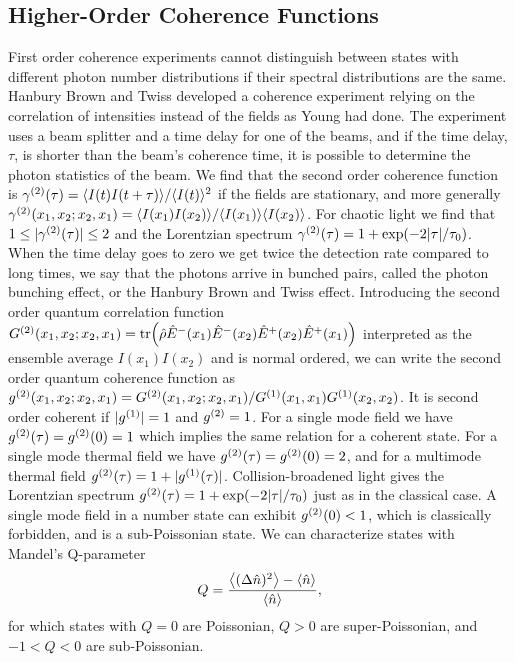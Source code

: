 \subsection{Higher-Order Coherence Functions}
First order coherence experiments cannot distinguish between states with different photon number distributions if their spectral distributions are the same. Hanbury Brown and Twiss developed a coherence experiment relying on the correlation of intensities instead of the fields as Young had done. The experiment uses a beam splitter and a time delay for one of the beams, and if the time delay, $\tau$, is shorter than the beam's coherence time, it is possible to determine the photon statistics of the beam. We find that the second order coherence function is $\gamma^{(2)}(\tau) = \langle I(t)I(t+\tau)\rangle / \langle I(t) \rangle^2$ if the fields are stationary, and more generally $\gamma^{(2)}(x_1,x_2;x_2,x_1) = \langle I(x_1)I(x_2)\rangle / \langle I(x_1) \rangle\langle I(x_2)\rangle$. For chaotic light we find that $1 \leq |\gamma^{(2)}(\tau)| \leq 2$ and the Lorentzian spectrum $\gamma^{(2)}(\tau) = 1 + \exp(-2|\tau|/\tau_0)$. When the time delay goes to zero we get twice the detection rate compared to long times, we say that the photons arrive in bunched pairs, called the photon bunching effect, or the Hanbury Brown and Twiss effect. Introducing the second order quantum correlation function $G^{(2)}(x_1,x_2;x_2,x_1) = \tr(\hat{\rho} \hat{E}^-(x_1) \hat{E}^-(x_2) \hat{E}^+(x_2) \hat{E}^+(x_1))$ interpreted as the ensemble average $I(x_1)I(x_2)$ and is normal ordered, we can write the second order quantum coherence function as $g^{(2)}(x_1,x_2;x_2,x_1) = G^{(2)}(x_1,x_2;x_2,x_1) / G^{(1)}(x_1,x_1)G^{(1)}(x_2,x_2)$. It is second order coherent if $|g^{(1)}| = 1$ and $g^{(2)}=1$. For a single mode field we have $g^{(2)}(\tau) = g^{(2)}(0) = 1$ which implies the same relation for a coherent state. For a single mode thermal field we have $g^{(2)}(\tau) = g^{(2)}(0) = 2$, and for a multimode thermal field $g^{(2)}(\tau) = 1 + |g^{(1)}(\tau)|$. Collision-broadened light gives the Lorentzian spectrum $g^{(2)}(\tau) = 1 + \exp(-2|\tau|/\tau_0)$ just as in the classical case. A single mode field in a number state can exhibit $g^{(2)}(0) < 1$, which is classically forbidden, and is a sub-Poissonian state. We can characterize states with Mandel's Q-parameter
\begin{equation}
    Q = \frac{\expval{(\Delta \hat{n})^2} - \expval{\hat{n}}}{\expval{\hat{n}}},
\end{equation}
for which states with $Q=0$ are Poissonian, $Q>0$ are super-Poissonian, and $-1<Q<0$ are sub-Poissonian. 